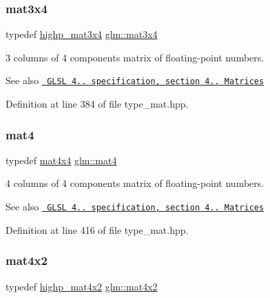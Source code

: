 \subsubsection{\texorpdfstring{mat3x4}{mat3x4}}
{\footnotesize\ttfamily typedef \mbox{\hyperlink{group__core__precision_gab51b3b8377cf9462a39a1560333a4215}{highp\+\_\+mat3x4}} \mbox{\hyperlink{group__core__types_ga5524ae15d7fc00a68b8e0e3a0733cc2a}{glm\+::mat3x4}}}

3 columns of 4 components matrix of floating-\/point numbers.

\begin{DoxySeeAlso}{See also}
\href{http://www.opengl.org/registry/doc/GLSLangSpec.4.20.8.pdf}{\texttt{ G\+L\+SL 4.. specification, section 4.. Matrices}} 
\end{DoxySeeAlso}


Definition at line 384 of file type\+\_\+mat.\+hpp.

\mbox{\label{group__core__types_ga7dcd2365c2e368e6af5b7adeb6a9c8df}} 
\subsubsection{\texorpdfstring{mat4}{mat4}}
{\footnotesize\ttfamily typedef \mbox{\hyperlink{group__core__types_ga63e3ee9447ed593484140a9368e738ec}{mat4x4}} \mbox{\hyperlink{group__core__types_ga7dcd2365c2e368e6af5b7adeb6a9c8df}{glm\+::mat4}}}

4 columns of 4 components matrix of floating-\/point numbers.

\begin{DoxySeeAlso}{See also}
\href{http://www.opengl.org/registry/doc/GLSLangSpec.4.20.8.pdf}{\texttt{ G\+L\+SL 4.. specification, section 4.. Matrices}} 
\end{DoxySeeAlso}


Definition at line 416 of file type\+\_\+mat.\+hpp.

\mbox{\label{group__core__types_ga72cf8ec4f4cda85943f4683531e421bc}} 
\subsubsection{\texorpdfstring{mat4x2}{mat4x2}}
{\footnotesize\ttfamily typedef \mbox{\hyperlink{group__core__precision_ga289d5d6b112dc6e3f545e7f98d3d0b5c}{highp\+\_\+mat4x2}} \mbox{\hyperlink{group__core__types_ga72cf8ec4f4cda85943f4683531e421bc}{glm\+::mat4x2}}}

